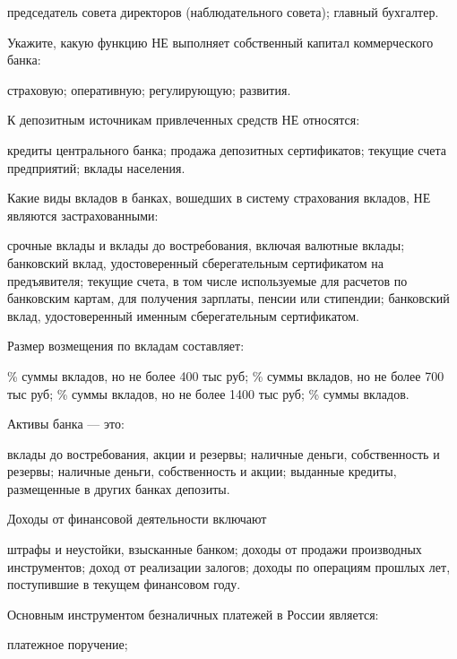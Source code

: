 \documentclass[12pt, table]{exam}
\begin{document}
\begin{questions}
\begin{multicols}{2}
\begin{choices}
	 \choice председатель совета директоров (наблюдательного совета);
	 \choice главный бухгалтер.
	 \end{choices}
\question Укажите, какую функцию НЕ выполняет собственный капитал коммерческого банка:
	 \begin{choices}
	 \choice страховую;
	 \choice оперативную;
	 \choice регулирующую;
	 \CC развития.
	 \end{choices}
\question К депозитным источникам привлеченных средств НЕ относятся:
	 \begin{choices}
	 \CC кредиты центрального банка;
	 \choice продажа депозитных сертификатов;
	 \choice текущие счета предприятий;
	 \choice вклады населения.
	 \end{choices}
\question Какие виды вкладов в банках, вошедших в систему страхования вкладов, НЕ являются застрахованными:
	 \begin{choices}
	 \choice срочные вклады и вклады до востребования, включая валютные вклады;
	 \CC банковский вклад, удостоверенный сберегательным сертификатом на предъявителя;
	 \choice текущие счета, в том числе используемые для расчетов по банковским картам, для получения зарплаты, пенсии или стипендии;
	 \choice банковский вклад, удостоверенный именным сберегательным сертификатом.
	 \end{choices}
\question Размер возмещения по вкладам составляет:
	 \begin{choices}
	 \% суммы вкладов, но не более 400 тыс руб;
	 \% суммы вкладов, но не более 700 тыс руб;
	 \% суммы вкладов, но не более 1400 тыс руб;
	 \% суммы вкладов.
	 \end{choices}
\question Активы банка — это:
	 \begin{choices}
	 \choice вклады до востребования, акции и резервы;
	 \choice наличные деньги, собственность и резервы;
	 \choice наличные деньги, собственность и акции;
	 \CC выданные кредиты, размещенные в других банках депозиты.
	 \end{choices}
\question Доходы от финансовой деятельности включают
	 \begin{choices}
	 \choice штрафы и неустойки, взысканные банком;
	 \CC доходы от продажи производных инструментов;
	 \choice доход от реализации залогов;
	 \choice доходы по операциям прошлых лет, поступившие в текущем финансовом году.
	 \end{choices}
\question Основным инструментом безналичных платежей в России является:
	 \begin{choices}
	 \CC платежное поручение;

\end{choices}
\end{multicols}
\end{questions}
\end{document}
